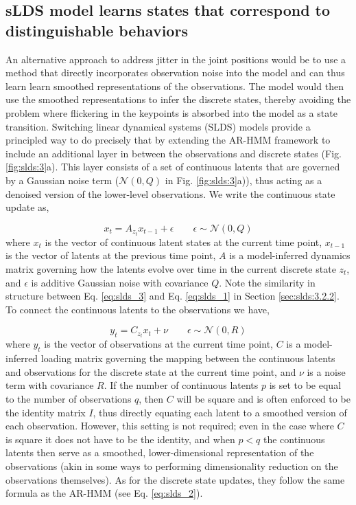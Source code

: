 \subsection{sLDS model learns states that correspond to distinguishable behaviors}
\label{sec:slds:3.2.3}
An alternative approach to address jitter in the joint positions would be to use a method that directly incorporates observation noise into the model and can thus learn learn smoothed representations of the observations. The model would then use the smoothed representations to infer the discrete states, thereby avoiding the problem where flickering in the keypoints is absorbed into the model as a state transition. Switching linear dynamical systems (SLDS) models provide a principled way to do precisely that by extending the AR-HMM framework to include an additional layer in between the observations and discrete states (Fig. \ref{fig:slds:3}a). This layer consists of a set of continuous latents that are governed by a Gaussian noise term ($\mathcal{N}(0,Q)$ in Fig. \ref{fig:slds:3}a)), thus acting as a denoised version of the lower-level observations. We write the continuous state update as, 

\begin{equation} \label{eq:slds_3}
x_t = A_{z_t} x_{t-1} + \epsilon \qquad \epsilon \sim \mathcal{N}(0,Q)
\end{equation}
where $x_t$ is the vector of continuous latent states at the current time point, $x_{t-1}$ is the vector of latents at the previous time point, $A$ is a model-inferred dynamics matrix governing how the latents evolve over time in the current discrete state $z_t$, and $\epsilon$ is additive Gaussian noise with covariance $Q$. Note the similarity in structure between Eq. \ref{eq:slds_3} and Eq. \ref{eq:slds_1} in Section \ref{sec:slds:3.2.2}. To connect the continuous latents to the observations we have, 

\begin{equation} \label{eq:slds_4}
y_t = C_{z_t}x_{t} + \nu \qquad \epsilon \sim \mathcal{N}(0,R)
\end{equation}
where $y_t$ is the vector of observations at the current time point, $C$ is a model-inferred loading matrix governing the mapping between the continuous latents and observations for the discrete state at the current time point, and $\nu$ is a noise term with covariance $R$. If the number of continuous latents $p$ is set to be equal to the number of observations $q$, then $C$ will be square and is often enforced to be the identity matrix $I$, thus directly equating each latent to a smoothed version of each observation. However, this setting is not required; even in the case where $C$ is square it does not have to be the identity, and when $p<q$ the continuous latents then serve as a smoothed, lower-dimensional representation of the observations (akin in some ways to performing dimensionality reduction on the observations themselves). As for the discrete state updates, they follow the same formula as the AR-HMM (see Eq. \ref{eq:slds_2}). 

